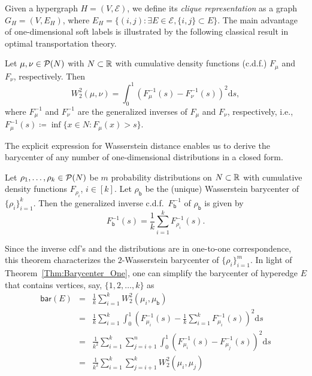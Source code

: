 \documentclass[letterpaper]{article} %
\begin{document}
Given a hypergraph $H=(V, \mathcal E)$, we define its \textit{clique representation} as a graph $G_H=(V, E_H)$, where $E_H=\{(i, j):\exists E\in \mathcal E, \{i, j\}\subset E\}$. The main advantage of one-dimensional soft labels is illustrated by the following classical result in optimal transportation theory.
\begin{theorem}\label{Thm:Wasserstein_One}
Let $\mu, \nu\in \P(N)$ with $N\subset\R$ with cumulative density functions (c.d.f.) $F_\mu$ and $F_\nu$, respectively. Then $$W_2^2(\mu, \nu)=\int_{0}^1\left(F_\mu^{-1}(s)-F_\nu^{-1}(s)\right)^2\text{d}s,$$
where $F_{\mu}^{-1}$ and $F_{\nu}^{-1}$ are the generalized inverses of $F_\mu$ and $F_\nu$, respectively, i.e., $F_\mu^{-1}(s)\coloneqq \inf\{x\in N:F_\mu(x)>s\}$. 
\end{theorem}
The explicit expression for Wasserstein distance enables us to derive the barycenter of any number of one-dimensional distributions in a closed form. 
\begin{theorem}
\label{Thm:Barycenter_One}
Let $\rho_1, \dots, \rho_k\in \P(N)$ be $m$ probability distributions on $N\subset\R$ with cumulative density functions $F_{\rho_i}$, $i\in [k]$. Let $\rho_{\mathsf{b}}$ be the (unique) Wasserstein barycenter of $\{\rho_i\}_{i=1}^k$. Then the generalized inverse c.d.f.\ $F^{-1}_{\mathsf{b}}$ of $\rho_{\mathsf{b}}$ is given by 
$$F^{-1}_{\mathsf{b}}(s)=\frac{1}{k}\sum_{i=1}^kF_{\rho_i}^{-1}(s).$$
\end{theorem}
Since the inverse cdf's and the distributions are in one-to-one correspondence, this theorem characterizes the $2$-Wasserstein barycenter of $\{\rho_i\}_{i=1}^m$. In light of Theorem~\ref{Thm:Barycenter_One}, one can simplify the barycenter of hyperedge $E$ that contains vertices, say, $\{1, 2, \dots, k\}$ as
\begin{eqnarray}
\mathsf{bar}(E) &=& \frac{1}{k}\sum_{i=1}^kW^2_2(\mu_i, \mu_\mathsf{b})\nonumber\\
&=&\frac{1}{k}\sum_{i=1}^k\int_{0}^{1}\left(F_{\mu_i}^{-1}(s)-\frac{1}{k}\sum_{i=1}^kF_{\mu_i}^{-1}(s)\right)^2\text{d}s\nonumber\\
&=&\frac{1}{k^2}\sum_{i=1}^k\sum_{j=i+1}^n\int_0^1\left(F_{\mu_i}^{-1}(s)-F_{\mu_j}^{-1}(s)\right)^2 \text{d}s \nonumber\\
&=&\frac{1}{k^2}\sum_{i=1}^k\sum_{j=i+1}^kW_2^2(\mu_i, \mu_j)\label{Eq:One_D_Equivalence}
\end{eqnarray}
\end{document}
